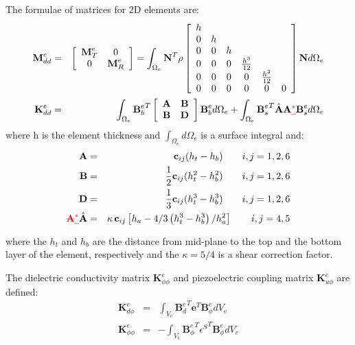 \documentclass[materials,article,submit,moreauthors,pdftex]{Definitions/mdpi}
\providecommand{\DIFdel}[1]{{\protect\color{red}\sout{#1}}}                      %
\providecommand{\DIFaddbegin}{} %
\providecommand{\DIFaddend}{} %
\providecommand{\DIFdelbegin}{} %
\providecommand{\DIFdelend}{} %
\begin{document}
The formulae of matrices for 2D elements are:
\begin{eqnarray}
\textbf{M}_{dd}^e & = &
\left [
\begin{array}{cc}
\textbf{M}_T^e & 0\\
0 & \textbf{M}_R^e
\end{array}
\right] =
\int_{\Omega_e}\textbf{N}^T\rho 
\left [
\begin{array}{cccccc}
h &  & &  &  &\\
0 & h & & & &\\
0 & 0 & h & & & \\
0 & 0 & 0 & \frac{h^3}{12} & &\\
0 & 0 & 0 & 0 & \frac{h^3}{12} &\\
0 & 0 & 0 & 0 & 0 & 0
\end{array} \right]
\textbf{N} d\Omega_e\\
\textbf{K}_{dd}^e & = & \int_{\Omega_e}{\textbf{B}_b^e}^T
\left[
\begin{array}{cc}
\textbf{A} & \textbf{B}\\
\textbf{B} & \textbf{D}
\end{array} \right]
\textbf{B}_b^ed \Omega_e+\int_{\Omega_e}{\textbf{B}_s^e}^T\DIFaddbegin \hat{\textbf{A}}\DIFaddend \textbf{A}\DIFdelbegin \DIFdel{^{\ast}}\DIFdelend \textbf{B}_s^ed \Omega_e
\end{eqnarray}
where h is the element thickness and \(\int_{\Omega_e}d\Omega_e\) is a surface integral and:
\begin{eqnarray}
\textbf{A} & = & \textbf{c}_{ij}(h_t-h_b)\qquad i,j=1,2,6\nonumber\\
\textbf{B} & = & \frac{1}{2}\textbf{c}_{ij}(h_t^2-h_b^2)\qquad i,j=1,2,6\nonumber\\
\textbf{D} & = & \frac{1}{3}\textbf{c}_{ij}(h_t^3-h_b^3)\qquad i,j=1,2,6\nonumber\\
\DIFdelbegin \textbf{\DIFdel{A}}%
\DIFdel{^{\ast} }\DIFdelend \DIFaddbegin \hat{\textbf{A}} \DIFaddend & = & \kappa \, \textbf{c}_{ij}\left[h_a-4/3\left(h_t^3-h_b^3\right)/h_a^2\right]\qquad i,j=4,5\nonumber
\end{eqnarray}
where the \(h_t\) and \(h_b\) are the distance from mid-plane to the top and the bottom layer of the element, respectively and the \(\kappa=5/4\) is a shear correction factor.

The dielectric conductivity matrix \(\textbf{K}_{\phi \phi}^e\) and piezoelectric coupling matrix \(\textbf{K}_{u \phi}^e\) are defined:
\begin{eqnarray}
\textbf{K}_{d\phi}^e & = & \int_{V_e}{\textbf{B}_d^e}^T\textbf{e}^T \textbf{B}_{\phi}^ed V_e\\
\textbf{K}_{\phi \phi}^e & = & -\int_{V_e}{\textbf{B}_{\phi}^e}^T 
{\textbf{\(\epsilon\)}^S}^T \textbf{B}_{\phi}^edV_e
\end{eqnarray}
\end{document}

